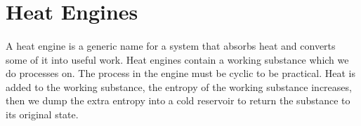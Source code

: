 \documentclass[../thermodynamics.tex]{subfiles}
\begin{document}
    \section{Heat Engines}
        \paragraph{}
        A heat engine is a generic name for a system that absorbs heat and converts some of it into useful work.
        Heat engines contain a working substance which we do processes on.
        The process in the engine must be cyclic to be practical.
        Heat is added to the working substance, the entropy of the working substance increases, then we dump the extra entropy into a cold reservoir to return the substance to its original state.
\end{document}
